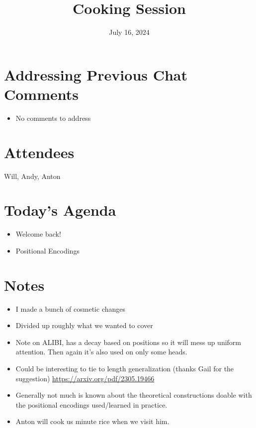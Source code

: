 \documentclass{article}
\title{Cooking Session}
\date{July 16, 2024}
\begin{document}
\maketitle

\section{Addressing Previous Chat Comments}
\begin{itemize}
   \item No comments to address
\end{itemize}

\section{Attendees}

Will, Andy, Anton

\section{Today's Agenda}
\begin{itemize}
    \item Welcome back!
    \item Positional Encodings
\end{itemize}

\section{Notes}
\begin{itemize}
    \item I made a bunch of cosmetic changes
    \item Divided up roughly what we wanted to cover
    \item Note on ALIBI, has a decay based on positions so it will mess up uniform attention. Then again it's also used on only some heads.
    \item Could be interesting to tie to length generalization (thanks Gail for the suggestion) \url{https://arxiv.org/pdf/2305.19466}
    \item Generally not much is known about the theoretical constructions doable with the positional encodings used/learned in practice.
    \item Anton will cook us minute rice when we visit him.
\end{itemize}




\end{document}
